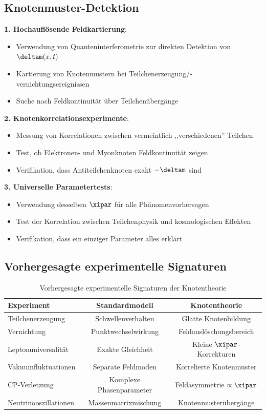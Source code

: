 	\subsection{Knotenmuster-Detektion}
	
	\textbf{1. Hochauflösende Feldkartierung}:
	\begin{itemize}
		\item Verwendung von Quanteninterferometrie zur direkten Detektion von $\deltam(x,t)$
		\item Kartierung von Knotenmustern bei Teilchenerzeugung/-vernichtungsereignissen
		\item Suche nach Feldkontinuität über Teilchenübergänge
	\end{itemize}
	
	\textbf{2. Knotenkorrelationsexperimente}:
	\begin{itemize}
		\item Messung von Korrelationen zwischen vermeintlich ,,verschiedenen'' Teilchen
		\item Test, ob Elektronen- und Myonknoten Feldkontinuität zeigen
		\item Verifikation, dass Antiteilchenknoten exakt $-\deltam$ sind
	\end{itemize}
	
	\textbf{3. Universelle Parametertests}:
	\begin{itemize}
		\item Verwendung desselben $\xipar$ für alle Phänomenvorhersagen
		\item Test der Korrelation zwischen Teilchenphysik und kosmologischen Effekten
		\item Verifikation, dass ein einziger Parameter alles erklärt
	\end{itemize}
	
	\subsection{Vorhergesagte experimentelle Signaturen}
	
	\begin{table}[htbp]
		\centering
		\begin{tabular}{lcc}
			\toprule
			\textbf{Experiment} & \textbf{Standardmodell} & \textbf{Knotentheorie} \\
			\midrule
			Teilchenerzeugung & Schwellenverhalten & Glatte Knotenbildung \\
			Vernichtung & Punktwechselwirkung & Feldauslöschungsbereich \\
			Leptonuniversalität & Exakte Gleichheit & Kleine $\xipar$-Korrekturen \\
			Vakuumfluktuationen & Separate Feldmoden & Korrelierte Knotenmuster \\
			CP-Verletzung & Komplexe Phasenparameter & Feldasymmetrie $\propto \xipar$ \\
			Neutrinooszillationen & Massenmatrixmischung & Knotenmusterübergänge \\
			\bottomrule
		\end{tabular}
		\caption{Vorhergesagte experimentelle Signaturen der Knotentheorie}
		\label{tab:experimental_signatures}
	\end{table}
	
